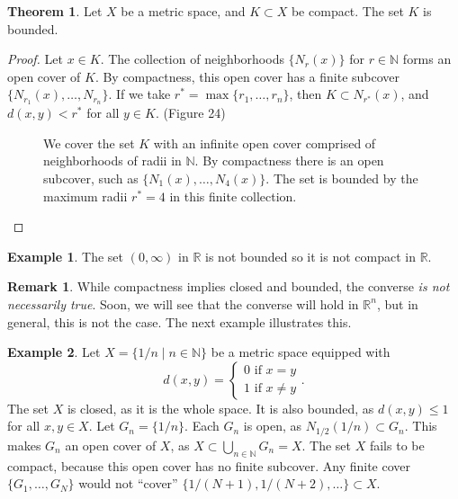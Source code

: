 \documentclass{article}
\newcommand{\N}{\mathbb{N}}
\newcommand{\R}{\mathbb{R}}
\theoremstyle{definition}
\newtheorem{theorem}{Theorem}[section]
\newtheorem{example}{Example}[section]
\newtheorem{remark}{Remark}[section]
\begin{document}
\begin{theorem}
	Let $ X $ be a metric space, and $ K\subset X $ be compact. The set $ K $ is bounded. 
\end{theorem}
\begin{proof}
Let $ x\in K $. The collection of neighborhoods $ \{N_r(x)\} $ for $ r\in\N $ forms an open cover of $ K $. By compactness, this open cover has a finite subcover $ \{N_{r_1}(x),\ldots,N_{r_n}\} $. If we take $ r^*=\max\{r_1,\ldots,r_n\} $, then $ K\subset N_{r^*}(x) $, and $ d(x,y)<r^* $ for all $ y\in K $. (Figure 24)
  \begin{figure}[h!]
	\centering
	\caption{We cover the set $ K $ with an infinite open cover comprised of neighborhoods of radii in $ \N $. By compactness there is an open subcover, such as $ \{N_1(x),\ldots,N_4(x)\} $. The set is bounded by the maximum radii $ r^*=4 $ in this finite collection.}  
\end{figure}
\end{proof}
\begin{example}
The set $ (0,\infty) $ in $ \R $ is not bounded so it is not compact in $ \R $. 
\end{example}
\begin{remark}
	While compactness implies closed and bounded, the converse \textit{is not necessarily true}. Soon, we will see that the converse will hold in $ \R^n $, but in general, this is not the case. The next example illustrates this.
\end{remark}
\begin{example}
	Let $ X=\{1/n\mid n\in\N\} $ be a metric space equipped with $$ d(x,y)=\begin{cases}
	0\text{ if }x=y\\1\text{ if }x\neq y
	\end{cases}.$$
The set $ X $ is closed, as it is the whole space. It is also bounded, as $ d(x,y)\le 1 $ for all $ x,y\in X $. Let $ G_n=\{1/n\} $. Each $ G_n $ is open, as $ N_{1/2}(1/n)\subset G_n $. This makes $ G_n $ an open cover of $ X $, as $ X\subset\bigcup_{n\in \N} G_n=X $. The set $ X $ fails to be compact, because this open cover has no finite subcover. Any finite cover $ \{G_{1},\ldots,G_{N}\} $ would not ``cover''  $ \{1/(N+1),1/(N+2),\ldots\}\subset X $.	
\end{example}
\end{document}
